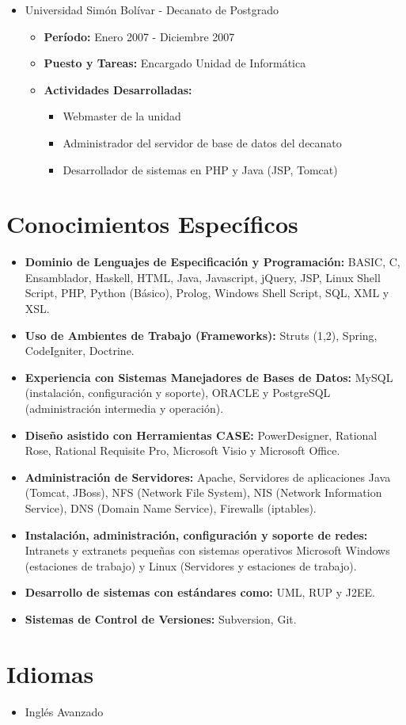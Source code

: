 \documentclass[letterpaper,12pt]{report}
\begin{document}
\begin{itemize}
        \item{Universidad Simón Bolívar - Decanato de Postgrado}
        \begin{itemize}
            \item{\textbf{Período:} Enero 2007 - Diciembre 2007}
            \item{\textbf{Puesto y Tareas:} Encargado Unidad de Informática}
            \item{\textbf{Actividades Desarrolladas:}}
            \begin{itemize}
                \item Webmaster de la unidad
                \item Administrador del servidor de base de datos del decanato
                \item Desarrollador de sistemas en PHP y Java (JSP, Tomcat)
            \end{itemize}
        \end{itemize}

    \end{itemize}


\section{Conocimientos Específicos}

    \begin{itemize}
    \item
    \textbf{Dominio de Lenguajes de Especificación y Programación:} BASIC, C, Ensamblador, Haskell, HTML, Java, Javascript, jQuery, JSP, Linux Shell Script, PHP, Python (Básico), Prolog, Windows Shell Script, SQL, XML y XSL.
    \item
    \textbf{Uso de Ambientes de Trabajo (Frameworks):} Struts (1,2), Spring, CodeIgniter, Doctrine.
    \item
    \textbf{Experiencia con Sistemas Manejadores de Bases de Datos:} MySQL (instalación, configuración y soporte), ORACLE y PostgreSQL (administración intermedia y operación).
    \item
    \textbf{Dise\~{n}o asistido con Herramientas CASE:} PowerDesigner, Rational Rose, Rational Requisite Pro, Microsoft Visio y Microsoft Office.
    \item
    \textbf{Administración de Servidores:} Apache, Servidores de aplicaciones Java (Tomcat, JBoss), NFS (Network File System), NIS (Network Information Service), DNS (Domain Name Service), Firewalls (iptables).
    \item
    \textbf{Instalación, administración, configuración y soporte de redes:} Intranets y extranets peque\~{n}as con sistemas operativos Microsoft Windows (estaciones de trabajo) y Linux (Servidores y estaciones de trabajo).
    \item
    \textbf{Desarrollo de sistemas con estándares como:} UML, RUP y J2EE.
    \item
    \textbf{Sistemas de Control de Versiones:} Subversion, Git.
    \end{itemize}

\section{Idiomas}
\begin{itemize}
    \item Inglés Avanzado
\end{itemize}
\end{document}
